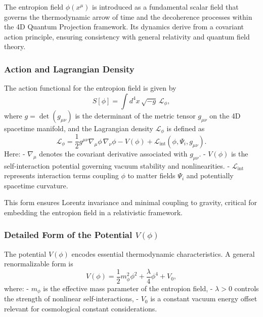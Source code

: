 \documentclass[12pt]{article}
\begin{document}
The entropion field \(\phi(x^\mu)\) is introduced as a fundamental scalar field that governs the thermodynamic arrow of time and the decoherence processes within the 4D Quantum Projection framework. Its dynamics derive from a covariant action principle, ensuring consistency with general relativity and quantum field theory.

\subsubsection*{Action and Lagrangian Density}

The action functional for the entropion field is given by
\begin{equation}
    S[\phi] = \int d^4x \, \sqrt{-g} \, \mathcal{L}_\phi,
    \label{eq:entropion_action}
\end{equation}
where \(g = \det(g_{\mu\nu})\) is the determinant of the metric tensor \(g_{\mu\nu}\) on the 4D spacetime manifold, and the Lagrangian density \(\mathcal{L}_\phi\) is defined as
\begin{equation}
    \mathcal{L}_\phi = \frac{1}{2} g^{\mu\nu} \nabla_\mu \phi \, \nabla_\nu \phi - V(\phi) + \mathcal{L}_{\mathrm{int}}(\phi, \Psi_i, g_{\mu\nu}).
    \label{eq:entropion_lagrangian_general}
\end{equation}
Here:
- \(\nabla_\mu\) denotes the covariant derivative associated with \(g_{\mu\nu}\).
- \(V(\phi)\) is the self-interaction potential governing vacuum stability and nonlinearities.
- \(\mathcal{L}_{\mathrm{int}}\) represents interaction terms coupling \(\phi\) to matter fields \(\Psi_i\) and potentially spacetime curvature.

This form ensures Lorentz invariance and minimal coupling to gravity, critical for embedding the entropion field in a relativistic framework.

\subsubsection*{Detailed Form of the Potential \(V(\phi)\)}

The potential \(V(\phi)\) encodes essential thermodynamic characteristics. A general renormalizable form is
\begin{equation}
    V(\phi) = \frac{1}{2} m_\phi^2 \phi^2 + \frac{\lambda}{4} \phi^4 + V_0,
    \label{eq:entropion_potential_expanded}
\end{equation}
where:
- \(m_\phi\) is the effective mass parameter of the entropion field,
- \(\lambda > 0\) controls the strength of nonlinear self-interactions,
- \(V_0\) is a constant vacuum energy offset relevant for cosmological constant considerations.
\end{document}
